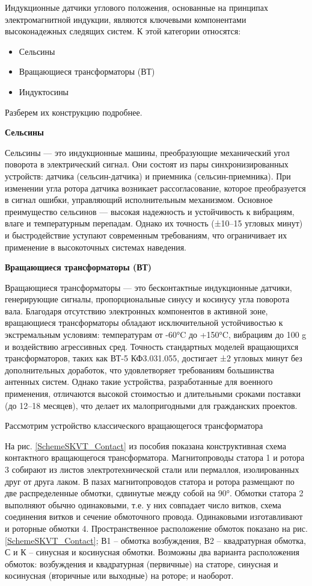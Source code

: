 Индукционные датчики углового положения, основанные на принципах электромагнитной индукции, являются ключевыми компонентами высоконадежных следящих систем. 
К этой категории относятся: 
\begin{itemize} 
  \item Сельсины 
  \item Вращающиеся трансформаторы (ВТ) 
  \item Индуктосины 
\end{itemize}

Разберем их конструкцию подробнее.

\textbf{Сельсины}

Сельсины — это индукционные машины, преобразующие механический угол поворота в электрический сигнал. Они состоят из пары синхронизированных устройств: датчика (сельсин-датчика) 
и приемника (сельсин-приемника). При изменении угла ротора датчика возникает рассогласование, которое преобразуется в сигнал ошибки, управляющий исполнительным механизмом.
Основное преимущество сельсинов — высокая надежность и устойчивость к вибрациям, влаге и температурным перепадам. Однако их точность (±10–15 угловых минут) 
и быстродействие уступают современным требованиям, что ограничивает их применение в высокоточных системах наведения.

\textbf{Вращающиеся трансформаторы (ВТ)}

Вращающиеся трансформаторы — это бесконтактные индукционные датчики, генерирующие сигналы, пропорциональные синусу и косинусу угла поворота вала. 
Благодаря отсутствию электронных компонентов в активной зоне, вращающиеся трансформаторы обладают исключительной устойчивостью к экстремальным условиям: температурам от -60°C до +150°C, 
вибрациям до 100 g и воздействию агрессивных сред.
Точность стандартных моделей вращающихся трансформаторов, таких как ВТ-5 КФ3.031.055, достигает ±2 угловых минут без дополнительных доработок, 
что удовлетворяет требованиям большинства антенных систем. 
Однако такие устройства, разработанные для военного применения, отличаются высокой стоимостью и длительными сроками поставки (до 12–18 месяцев), 
что делает их малопригодными для гражданских проектов.

Рассмотрим устройство классического вращающегося трансформатора

На рис. \ref{SchemeSKVT_Contact} из пособия \cite{AutoDevices} показана конструктивная схема контактного вращающегося трансформатора. 
Магнитопроводы статора 1 и ротора 3 собирают из листов электротехнической стали или пермаллоя, 
изолированных друг от друга лаком. В пазах магнитопроводов статора и ротора размещают по две распределенные обмотки, сдвинутые между собой на 90°. 
Обмотки статора 2 выполняют обычно одинаковыми, т.е. у них совпадает число витков, схема соединения витков и сечение обмоточного провода. 
Одинаковыми изготавливают и роторные обмотки 4. Пространственное расположение обмоток показано на рис. \ref{SchemeSKVT_Contact}; В1 – обмотка возбуждения, В2 – квадратурная обмотка, 
С и К – синусная и косинусная обмотки. Возможны два варианта расположения обмоток: возбуждения и квадратурная (первичные) на статоре, 
синусная и косинусная (вторичные или выходные) на роторе; и наоборот. 

